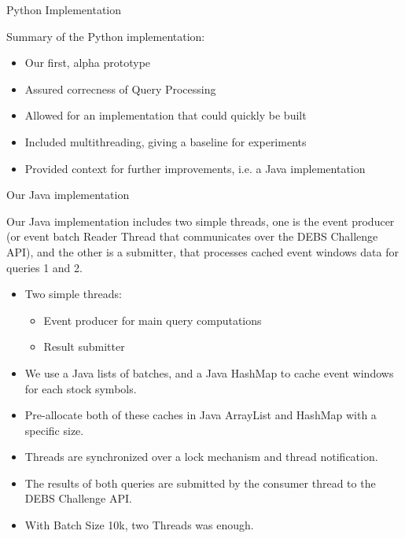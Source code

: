 \documentclass[9pt]{beamer}
\begin{document}
\begin{frame}[fragile]{ Python Implementation }


    Summary of the Python implementation:
    
    \begin{itemize}
        \item Our first, alpha prototype
        \item Assured correcness of Query Processing 
        \item Allowed for an implementation that could quickly be built
        \item Included multithreading, giving a baseline for experiments
        \item Provided context for further improvements, i.e. a Java implementation

    \end{itemize}


    
\end{frame}


\begin{frame}[fragile]{Our Java implementation }
    
    Our Java implementation includes two simple threads, one is the event producer (or event batch Reader Thread that communicates over the DEBS Challenge API), and the other is a submitter, that processes cached event windows data for queries 1 and 2. 
    \begin{itemize}
        \item Two simple threads:
        \begin{itemize}
            \item Event producer for main query computations
            \item Result submitter
        \end{itemize}
        \item We use a Java lists of batches, and a Java HashMap to cache event windows for each stock symbols. 
        \item Pre-allocate both of these caches in Java ArrayList and HashMap with a specific size.
        \item Threads are synchronized over a lock mechanism and thread notification.
        \item The results of both queries are submitted by the consumer thread to the DEBS Challenge API.
        \item With Batch Size 10k, two Threads was enough. 
    \end{itemize}


    
\end{frame}
\end{document}
